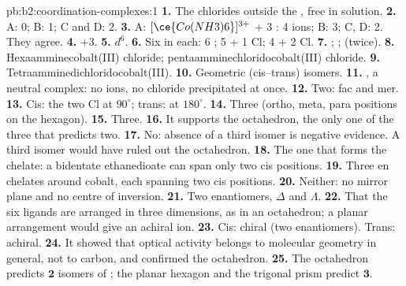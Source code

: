 \begin{solution}{pb:b2:coordination-complexes:1}
\textbf{1.} The chlorides outside the , free in solution.
\textbf{2.} A: 0; B: 1; C and D: 2.
\textbf{3.} A: $[\ce{Co(NH3)6}]^{3+}$ + 3 : 4 ions; B: 3; C, D: 2. They agree.
\textbf{4.} +3.
\textbf{5.} $d^6$.
\textbf{6.} Six in each: 6 ; 5  + 1 Cl; 4  + 2 Cl.
\textbf{7.} ; ;  (twice).
\textbf{8.} Hexaamminecobalt(III) chloride; pentaamminechloridocobalt(III) chloride.
\textbf{9.} Tetraamminedichloridocobalt(III).
\textbf{10.} Geometric (cis--trans) isomers.
\textbf{11.} \ce{[CoCl3(NH3)3]}, a neutral complex: no ions, no chloride precipitated at
once.
\textbf{12.} Two: fac and mer.
\textbf{13.} Cis: the two Cl at $90^\circ$; trans: at $180^\circ$.
\textbf{14.} Three (ortho, meta, para positions on the hexagon).
\textbf{15.} Three.
\textbf{16.} It supports the octahedron, the only one of the three that predicts two.
\textbf{17.} No: absence of a third isomer is negative evidence. A third isomer would
have ruled out the octahedron.
\textbf{18.} The one that forms the chelate: a bidentate ethanedioate can span only two
cis positions.
\textbf{19.} Three en chelates around cobalt, each spanning two cis positions.
\textbf{20.} Neither: no mirror plane and no centre of inversion.
\textbf{21.} Two enantiomers, $\Delta$ and $\Lambda$.
\textbf{22.} That the six ligands are arranged in three dimensions, as in an
octahedron; a planar arrangement would give an achiral ion.
\textbf{23.} Cis: chiral (two enantiomers). Trans: achiral.
\textbf{24.} It showed that optical activity belongs to molecular geometry in general,
not to carbon, and confirmed the octahedron.
\textbf{25.} The octahedron predicts $\boldsymbol{2}$ isomers of \ce{[CoCl2(NH3)4]+}; the
planar hexagon and the trigonal prism predict $\boldsymbol{3}$.
\end{solution}
